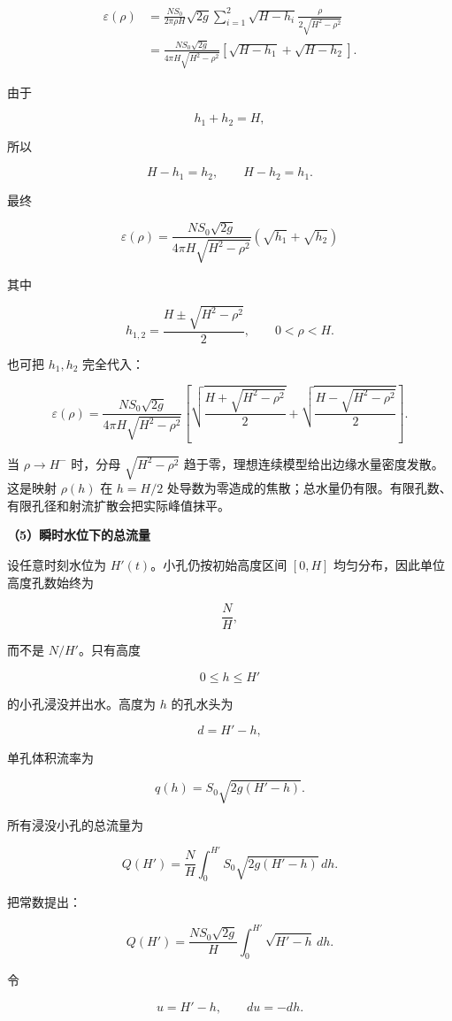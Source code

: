 \documentclass[12pt,a4paper,UTF8]{ctexart}
\begin{document}
\[\begin{aligned}
\varepsilon(\rho)
&=\frac{NS_0}{2\pi\rho H}
\sqrt{2g}
\sum_{i=1}^{2}
\sqrt{H-h_i}
\frac{\rho}{2\sqrt{H^2-\rho^2}}\\
&=\frac{NS_0\sqrt{2g}}
{4\pi H\sqrt{H^2-\rho^2}}
\left[
\sqrt{H-h_1}+\sqrt{H-h_2}
\right].
\end{aligned}\]

由于

\[h_1+h_2=H,\]

所以

\[H-h_1=h_2,\qquad H-h_2=h_1.\]

最终

\[\boxed{
\varepsilon(\rho)
=
\frac{NS_0\sqrt{2g}}
{4\pi H\sqrt{H^2-\rho^2}}
\left(\sqrt{h_1}+\sqrt{h_2}\right)
}\]

其中

\[\boxed{
h_{1,2}
=\frac{H\pm\sqrt{H^2-\rho^2}}{2}
},\qquad 0<\rho<H.\]

也可把 \(h_1,h_2\) 完全代入：

\[\boxed{
\varepsilon(\rho)
=
\frac{NS_0\sqrt{2g}}
{4\pi H\sqrt{H^2-\rho^2}}
\left[
\sqrt{\frac{H+\sqrt{H^2-\rho^2}}{2}}
+\sqrt{\frac{H-\sqrt{H^2-\rho^2}}{2}}
\right]
}.\]

当 \(\rho\to H^-\) 时，分母 \(\sqrt{H^2-\rho^2}\)
趋于零，理想连续模型给出边缘水量密度发散。这是映射 \(\rho(h)\) 在
\(h=H/2\)
处导数为零造成的焦散；总水量仍有限。有限孔数、有限孔径和射流扩散会把实际峰值抹平。

\textbf{（5）瞬时水位下的总流量}

设任意时刻水位为 \(H'(t)\)。小孔仍按初始高度区间 \([0,H]\)
均匀分布，因此单位高度孔数始终为

\[\frac NH,\]

而不是 \(N/H'\)。只有高度

\[0\leq h\leq H'\]

的小孔浸没并出水。高度为 \(h\) 的孔水头为

\[d=H'-h,\]

单孔体积流率为

\[q(h)=S_0\sqrt{2g(H'-h)}.\]

所有浸没小孔的总流量为

\[Q(H')
=\frac NH
\int_0^{H'}
S_0\sqrt{2g(H'-h)}\,dh.\]

把常数提出：

\[Q(H')
=\frac{NS_0\sqrt{2g}}{H}
\int_0^{H'}\sqrt{H'-h}\,dh.\]

令

\[u=H'-h,\qquad du=-dh.\]
\end{document}
